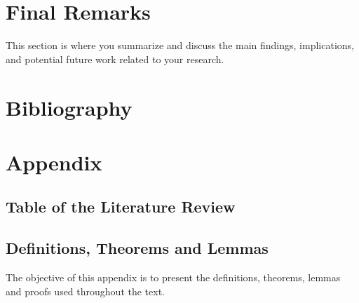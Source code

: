 \documentclass[
	12pt,
	]{article}
\numberwithin{equation}{section}
\theoremstyle{definition}
\theoremstyle{plain}
\theoremstyle{plain}
\theoremstyle{plain}
\begin{document}
\lipsum[1]


\section{Final Remarks}

This section is where you summarize and discuss the main findings, implications, and potential future work related to your research.

\lipsum[1]

\newpage


\section*{Bibliography}

{	
	\onehalfspacing
	\printbibliography[heading=bibintoc]
}

\newpage


\appendix

\section{Appendix}


\subsection{Table of the Literature Review}

\lipsum[1]


\subsection{Definitions, Theorems and Lemmas}

The objective of this appendix is to present the definitions, theorems, lemmas and proofs used throughout the text.
\end{document}
